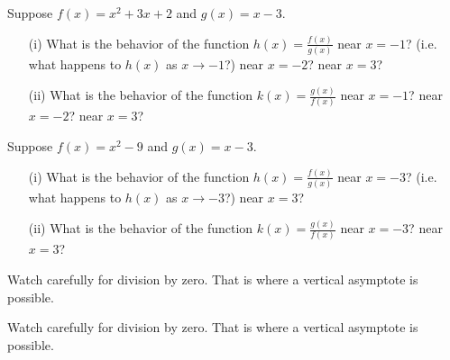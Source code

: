 \begin{activity}\label{A:0.6.3}
\ba
		\item Suppose $f(x) = x^{2}+ 3x + 2$ and $g(x) = x - 3$.  
			\begin{enumerate}
                \item[(i)] What is the behavior of the function $h(x) = \displaystyle{\frac {f(x)}{g(x)}}$ near $x = -1$? (i.e. what happens to $h(x)$ as $x\to -1$?) near $x = -2$? near $x = 3$?
                \item[(ii)] What is the behavior of the function $k(x) = \displaystyle{\frac {g(x)}{f(x)}}$ near $x = -1$? near $x = -2$? near $x = 3$?
			\end{enumerate}
		\item Suppose $f(x) = x^{2} - 9$ and $g(x) = x - 3$.  
			\begin{enumerate}
                \item[(i)] What is the behavior of the function $h(x) = \displaystyle{\frac {f(x)}{g(x)}}$ near $x = -3$? (i.e. what happens to $h(x)$ as $x\to -3$?) near $x = 3$?
                \item[(ii)] What is the behavior of the function $k(x) = \displaystyle{\frac {g(x)}{f(x)}}$ near $x = -3$? near $x = 3$?
			\end{enumerate}
\ea

\end{activity}
\begin{smallhint}
    Watch carefully for division by zero.  That is where a vertical asymptote is possible.
\end{smallhint}
\begin{bighint}
    Watch carefully for division by zero.  That is where a vertical asymptote is possible.
\end{bighint}

